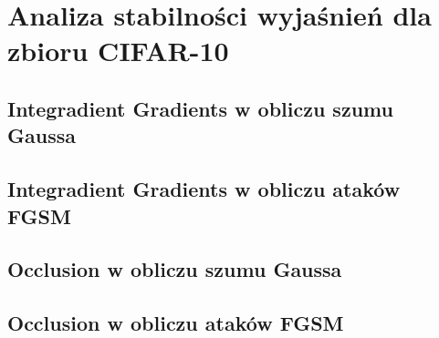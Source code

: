 \chapter{Analiza stabilności wyjaśnień dla zbioru CIFAR-10}


\section{Integradient Gradients w obliczu szumu Gaussa}
\section{Integradient Gradients w obliczu ataków FGSM}
\section{Occlusion w obliczu szumu Gaussa}
\section{Occlusion w obliczu ataków FGSM}
